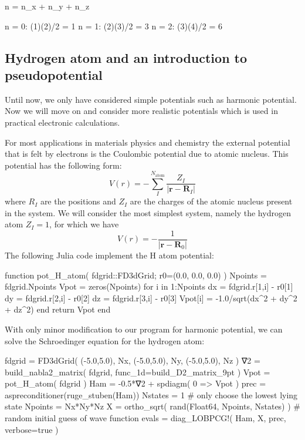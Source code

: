 \begin{textcode}
n = n_x + n_y + n_z

n = 0: (1)(2)/2 = 1
n = 1: (2)(3)/2 = 3
n = 2: (3)(4)/2 = 6
\end{textcode}

\subsection{Hydrogen atom and an introduction to pseudopotential}

Until now, we only have considered simple potentials such as harmonic potential. Now we will
move on and consider more realistic potentials which is used in practical electronic calculations.

For most applications in materials physics and chemistry the external potential that is
felt by electrons is the Coulombic potential due to atomic nucleus. This potential has
the following form:
\begin{equation}
V(r) = -\sum_{I}^{N_{\mathrm{atom}}} \frac{Z_{I}}{\left|\mathbf{r} - \mathbf{R}_{I}\right|}
\end{equation}
where $R_{I}$ are the positions and $Z_{I}$ are the charges
of the atomic nucleus present in the system.
%
We will consider the most simplest system, namely the hydrogen atom $Z_{I}=1$, for which we have
\begin{equation}
V(r) = -\frac{1}{\left|\mathbf{r} - \mathbf{R}_{0}\right|}
\end{equation}
%
The following Julia code implement the H atom potential:
\begin{juliacode}
function pot_H_atom( fdgrid::FD3dGrid; r0=(0.0, 0.0, 0.0) )
    Npoints = fdgrid.Npoints
    Vpot = zeros(Npoints)
    for i in 1:Npoints
        dx = fdgrid.r[1,i] - r0[1]
        dy = fdgrid.r[2,i] - r0[2]
        dz = fdgrid.r[3,i] - r0[3]
        Vpot[i] = -1.0/sqrt(dx^2 + dy^2 + dz^2)
    end
    return Vpot
end
\end{juliacode}

With only minor modification to our program for harmonic potential, we can solve the Schroedinger
equation for the hydrogen atom:
\begin{juliacode}
fdgrid = FD3dGrid( (-5.0,5.0), Nx, (-5.0,5.0), Ny, (-5.0,5.0), Nz )
∇2 = build_nabla2_matrix( fdgrid, func_1d=build_D2_matrix_9pt )
Vpot = pot_H_atom( fdgrid )
Ham = -0.5*∇2 + spdiagm( 0 => Vpot )
prec = aspreconditioner(ruge_stuben(Ham))
Nstates = 1  # only choose the lowest lying state
Npoints = Nx*Ny*Nz
X = ortho_sqrt( rand(Float64, Npoints, Nstates) ) # random initial guess of wave function
evals = diag_LOBPCG!( Ham, X, prec, verbose=true )
\end{juliacode}

